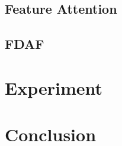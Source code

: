\documentclass{article}
\begin{document}
\subsection{Feature Attention}



\subsection{FDAF}




\section{Experiment}




\section{Conclusion}



\newpage




\end{document}
